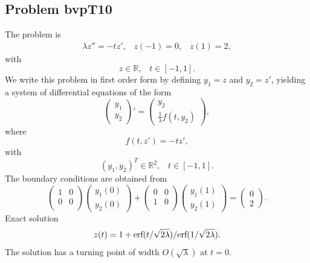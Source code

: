 \documentclass[<options>]{article}
\def \RR {{\mathbb{R}}}
\begin{document}
\subsection{Problem bvpT10}\label{test10}
The problem is 
\begin{eqnarray*}
\lambda z'' = -t z' , \;\;\;z(-1) = 0, \;\;\; z(1) = 2,
\end{eqnarray*}
with
\[
z \in \RR, \;\;\; t\in [-1,1].
\]
We write this problem in first order form by defining $y_1=z$ and $y_2=z'$, yielding a system of differential equations of the form
\begin{equation*}
\left(\begin{array}{c}
y_1\\
y_2
\end{array}\right)'=
\left(\begin{array}{c}
y_2\\
\frac{1}{\lambda}f(t,y_2)
\end{array}\right),
\end{equation*}
where
\begin{equation*}
 f(t,z') = -t z',
\end{equation*}
with
\[
(y_1,y_2)^T \in \RR^{2}, \;\;\;  t \in [-1,1].
\]
The  boundary conditions are obtained from
\begin{equation*}
\left(
  \begin{array}{cc}
    1 & 0 \\
    0 & 0 \\
  \end{array}
\right)
\left(\begin{array}{c}
y_{1}(0)\\
y_{2}(0)
\end{array}\right)
+
\left(
  \begin{array}{cc}
    0 & 0 \\
    1 & 0 \\
  \end{array}
\right)
\left(\begin{array}{c}
y_{1}(1)\\
y_{2}(1)
\end{array}\right)=\left(\begin{array}{c}
0 \\
2
\end{array}\right).
\end{equation*}
\textrm{Exact solution}
$$z(t) = 1 + \textmd{erf}(t / \sqrt{2\lambda}) / \textmd{erf}(1 / \sqrt{2\lambda}).$$
The solution has a turning point of width $O(\sqrt\lambda)$  at $t = 0.$
\end{document}
